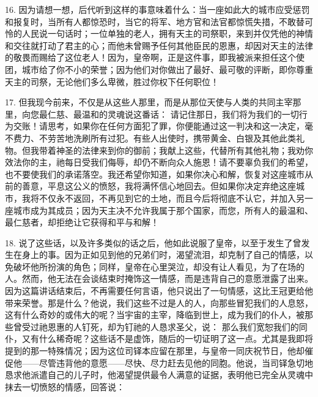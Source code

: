 16. 因为请想一想，后代听到这样的事意味着什么：当一座如此大的城市应受惩罚和报复时，当所有人都惊恐时，当它的将军、地方官和法官都惊慌失措，不敢替可怜的人民说一句话时；一位单独的老人，拥有天主的司祭职，来到并仅凭他的神情和交往就打动了君主的心；而他未曾赐予任何其他臣民的恩惠，却因对天主的法律的敬畏而赐给了这位老人！因为，皇帝啊，正是这件事，即我被派来担任这个使团，城市给了你不小的荣誉；因为他们对你做出了最好、最可敬的评断，即你尊重天主的司祭，无论他们多么卑微，胜过你权下任何职位！\par

17. 但我现今前来，不仅是从这些人那里，而是从那位天使与人类的共同主宰那里，向您最仁慈、最温和的灵魂说这番话： 请记住那日，我们将为我们的一切行为交账！请思考，如果你在任何方面犯了罪，你便能通过这一判决和这一决定，毫不费力、不劳苦地洗刷所有过犯。有些人出使时，携带黄金、白银及其他此类礼物。但我带着神圣的法律来到你的御前；我献上这些，代替所有其他礼物；我劝你效法你的主，祂每日受我们侮辱，却仍不断向众人施恩！请不要辜负我们的希望，也不要使我们的承诺落空。我还希望你知道，如果你决心和解，恢复对这座城市从前的善意，平息这公义的愤怒，我将满怀信心地回去。但如果你决定弃绝这座城市，我将不仅永不返回，不再见到它的土地，而且今后将彻底不认它，并加入另一座城市成为其成员；因为天主决不允许我属于那个国家，而您，所有人的最温和、最仁慈者，却拒绝让它获得和平与和解！\par

18. 说了这些话，以及许多类似的话之后，他如此说服了皇帝，以至于发生了曾发生在身上的事。因为正如见到他的兄弟们时，渴望流泪，却克制了自己的情感，以免破坏他所扮演的角色；同样，皇帝在心里哭泣，却没有让人看见，为了在场的人。然而，他无法在会谈结束时掩饰这一情感，而是违背自己的意愿泄露了出来。因为这篇讲话结束后，不再需要任何言语，他只说出了一句情感，这比王冠更给他带来荣誉。那是什么？他说，我们这些不过是人的人，向那些冒犯我们的人息怒，这有什么奇妙的或伟大的呢？当宇宙的主宰，降临到世上，成为我们的仆人，被那些曾受过祂恩惠的人钉死，却为钉祂的人恳求圣父，说： 那么我们宽恕我们的同仆，又有什么稀奇呢？这些话不是虚饰，随后的一切证明了这一点。尤其是我即将提到的那一特殊情况；因为这位司铎本应留在那里，与皇帝一同庆祝节日，他却催促他——尽管违背他的意愿——尽快、尽力赶去见他的同胞。他说，当司铎急切地恳求他派遣自己的儿子时，他渴望提供最令人满意的证据，表明他已完全从灵魂中抹去一切愤怒的情感，回答说：\par

